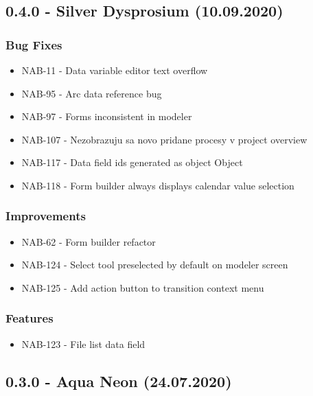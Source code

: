 \subsection*{0.4.0 - Silver Dysprosium (10.09.2020)}
  \subsubsection*{Bug Fixes}
    \begin{itemize}
      \item NAB-11 - Data variable editor text overflow
      \item NAB-95 - Arc data reference bug
      \item NAB-97 - Forms inconsistent in modeler
      \item NAB-107 - Nezobrazuju sa novo pridane procesy v project overview
      \item NAB-117 - Data field ids generated as object Object
      \item NAB-118 - Form builder always displays calendar value selection
    \end{itemize}

  \subsubsection*{Improvements}
    \begin{itemize}
      \item NAB-62 - Form builder refactor
      \item NAB-124 - Select tool preselected by default on modeler screen
      \item NAB-125 - Add action button to transition context menu
    \end{itemize}

  \subsubsection*{Features}
    \begin{itemize}
      \item NAB-123 - File list data field
    \end{itemize}

\subsection*{0.3.0 - Aqua Neon (24.07.2020)}
